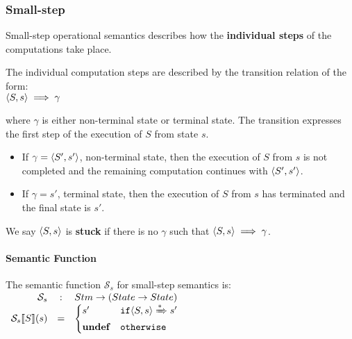 \subsubsection{Small-step}
\label{sec:small-step}

Small-step operational semantics describes how the \textbf{individual
  steps} of the computations take place.

The individual computation steps are described by the transition
relation of the form:
\\

\begin{math}
  \langle S, s \rangle \implies \gamma
\end{math}

where $\gamma$ is either non-terminal state or terminal state. The
transition expresses the first step of the execution of $S$ from state
$s$.

\begin{itemize}
\item If $ \gamma = \langle S', s' \rangle $, non-terminal state, then the
  execution of $S$ from $s$ is not completed and the remaining
  computation continues with $\langle S', s' \rangle$.
\item If $ \gamma = s'$, terminal state, then the execution of $S$
  from $s$ has terminated and the final state is $s'$.
\end{itemize}

We say $\langle S, s \rangle$ is \textbf{stuck} if there is no $\gamma$ such
that $\langle S, s \rangle \implies \gamma$.

\paragraph{Semantic Function}

The semantic function $\mathcal{S}_s$ for small-step semantics is:
\begin{math}
  \begin{array}{rcl}
    \mathcal{S}_s & : & Stm \to (State \to State) \\
    \mathcal{S}_s \llbracket S \rrbracket (s) & = &
                                    \begin{cases}
                                      s' & \mathtt{if} \langle S, s \rangle \xRightarrow{*} s' \\
                                      \mathbf{undef} & \mathtt{otherwise}
                                    \end{cases}

  \end{array}
\end{math}


